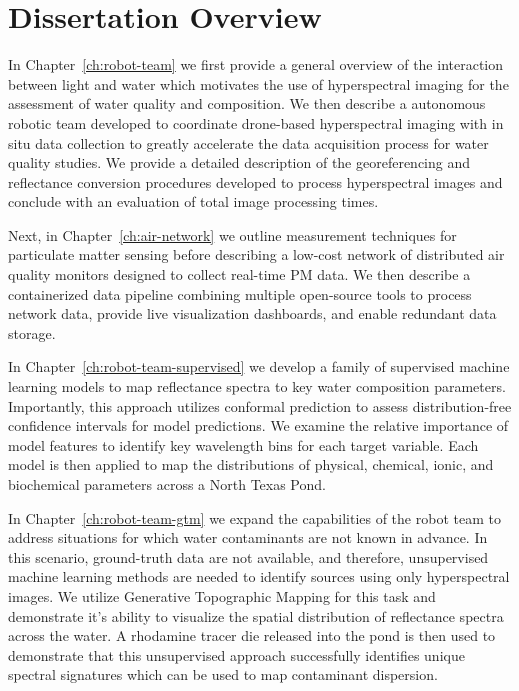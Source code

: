 \section{Dissertation Overview}

In Chapter~\ref{ch:robot-team} we first provide a general overview of the
interaction between light and water which motivates the use of hyperspectral imaging
for the assessment of water quality and composition. We then describe a
autonomous robotic team developed to coordinate drone-based hyperspectral imaging
with in situ data collection to greatly accelerate the data acquisition process
for water quality studies. We provide a detailed description of the
georeferencing and reflectance conversion procedures developed to process
hyperspectral images and conclude with an evaluation of total image processing times.

Next, in Chapter~\ref{ch:air-network} we outline measurement techniques for
particulate matter sensing before describing a low-cost network of distributed
air quality monitors designed to collect real-time PM data. We then describe a
containerized data pipeline combining multiple open-source tools to process
network data, provide live visualization dashboards, and enable redundant
data storage.

In Chapter~\ref{ch:robot-team-supervised} we develop a family of supervised
machine learning models to map reflectance spectra to key water composition
parameters. Importantly, this approach utilizes conformal prediction
to assess distribution-free confidence intervals for model predictions. We
examine the relative importance of model features to identify key wavelength
bins for each target variable. Each model is then applied to map the
distributions of physical, chemical, ionic, and biochemical parameters across a
North Texas Pond.

In Chapter~\ref{ch:robot-team-gtm} we expand the capabilities of the robot team
to address situations for which water contaminants are not known in advance. In
this scenario, ground-truth data are not available, and therefore, unsupervised
machine learning methods are needed to identify sources using only hyperspectral
images. We utilize Generative Topographic Mapping for this task and demonstrate
it's ability to visualize the spatial distribution of reflectance spectra across
the water. A rhodamine tracer die released into the pond is then used to
demonstrate that this unsupervised approach successfully identifies unique
spectral signatures which can be used to map contaminant dispersion.

